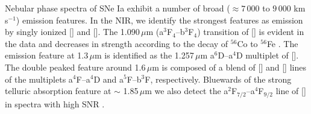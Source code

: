 \documentclass[fleqn,usenatbib]{mnras}
\begin{document}
Nebular phase spectra of SNe Ia exhibit a number of broad ($\approx7\,000$ to $9\,000$ km\,s$^{-1}$) emission features. In the NIR, we identify the strongest features as emission by singly ionized [] and []. The 1.090\,$\mu$m (a$^3$F$_4$--b$^3$F$_4$) transition of [] is evident in the data and decreases in strength according to the decay of $^{56}$Co to $^{56}$Fe \citep{2004A&A...426..547S, 2018A&A...620A.200F}. The emission feature at 1.3\,$\mu$m is identified as the 1.257\,$\mu$m a$^6$D--a$^4$D multiplet of []. The double peaked feature around 1.6\,$\mu$m is composed of a blend of [] and [] lines of the multiplets a$^4$F--a$^4$D and a$^5$F--b$^3$F, respectively. Bluewards of the strong telluric absorption feature at $\sim$ 1.85\,$\mu$m we also detect the a$^{2}$F$_{7/2}$--a$^{4}$F$_{9/2}$ line of [] in spectra with high SNR \citep{2018A&A...619A.102D}.
\end{document}
